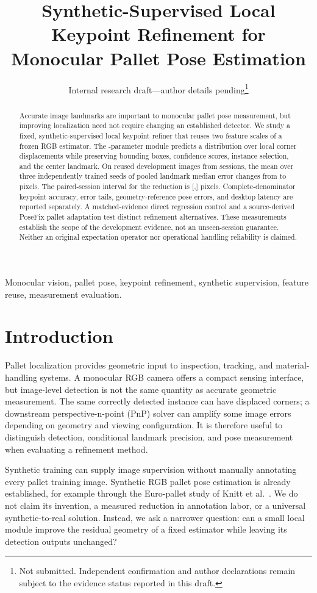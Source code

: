 \documentclass[journal]{IEEEtran}
\title{Synthetic-Supervised Local Keypoint Refinement for Monocular Pallet Pose Estimation}
\author{Internal research draft---author details pending\thanks{Not submitted. Independent confirmation and author declarations remain subject to the evidence status reported in this draft.}}
\begin{document}
\maketitle
\begin{abstract}
Accurate image landmarks are important to monocular pallet pose measurement, but improving localization need not require changing an established detector. We study a fixed, synthetic-supervised local keypoint refiner that reuses two feature scales of a frozen RGB estimator. The \Pparams{}-parameter module predicts a distribution over local corner displacements while preserving bounding boxes, confidence scores, instance selection, and the center landmark. On \DevN{} reused development images from \SessionN{} sessions, the mean over three independently trained seeds of pooled landmark median error changes from \Rmedian{} to \Pmedian{} pixels. The paired-session interval for the reduction is [\ImproveLow{},\ImproveHigh{}] pixels. Complete-denominator keypoint accuracy, error tails, geometry-reference pose errors, and desktop latency are reported separately. A matched-evidence direct regression control and a source-derived PoseFix pallet adaptation test distinct refinement alternatives. \PriorAbstract{} These measurements establish the scope of the development evidence, not an unseen-session guarantee. \ConfirmationAbstract{} Neither an original expectation operator nor operational handling reliability is claimed.
\end{abstract}
\begin{IEEEkeywords}
Monocular vision, pallet pose, keypoint refinement, synthetic supervision, feature reuse, measurement evaluation.
\end{IEEEkeywords}

\section{Introduction}
Pallet localization provides geometric input to inspection, tracking, and material-handling systems. A monocular RGB camera offers a compact sensing interface, but image-level detection is not the same quantity as accurate geometric measurement. The same correctly detected instance can have displaced corners; a downstream perspective-n-point (PnP) solver can amplify some image errors depending on geometry and viewing configuration. It is therefore useful to distinguish detection, conditional landmark precision, and pose measurement when evaluating a refinement method.

Synthetic training can supply image supervision without manually annotating every pallet training image. Synthetic RGB pallet pose estimation is already established, for example through the Euro-pallet study of Knitt et al.\ \cite{knitt}. We do not claim its invention, a measured reduction in annotation labor, or a universal synthetic-to-real solution. Instead, we ask a narrower question: can a small local module improve the residual geometry of a fixed estimator while leaving its detection outputs unchanged?
\end{document}
